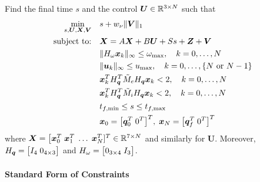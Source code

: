 \documentclass[12pt]{article}
\begin{document}
\begin{problem}
Find the final time $s$ and the control $\bm{U}\in{\mathbb{R}}^{3 \times N}$ such that
\begin{subequations}
\begin{align}
\min_{s,\bm{U},\bm{X},\bm{V}} &\quad s + w_{\nu} \| \bm{V} \|_1 \\
\text{subject to:} &\quad \bm{X} = A \bm{X} + B \bm{U} + S s + \bm{Z} + \bm{V} \\
&\quad \| H_{\omega} \bm{x}_k \|_{\infty} \leq \omega_{\max}, \quad k=0,\ldots,N \\ 
&\quad \| \bm{u}_k \|_{\infty} \leq u_{\max}, \quad k=0,\ldots,\{N \text{ or } N-1\} \\
&\quad \bm{x}_k^T H_{\bm{q}}^T \tilde{M}_e H_{\bm{q}} \bm{x}_k < 2, \quad k=0,\ldots,N \\
&\quad \bm{x}_k^T H_{\bm{q}}^T \tilde{M}_i H_{\bm{q}} \bm{x}_k < 2, \quad k=0,\ldots,N \\
&\quad t_{f,\min} \leq s \leq t_{f,\max} \\
&\quad \bm{x}_0 = \big[ \bm{q}_0^T \; 0^T \big]^T, \; \bm{x}_N = \big[ \bm{q}_f^T \; 0^T \big]^T
\end{align}
\end{subequations}
where $\bm{X} = \big[ \bm{x}_0^T \; \bm{x}_1^T \; \ldots \; \bm{x}_{N}^T ]^T \in {\mathbb{R}}^{7 \times N}$ and similarly for $\bm{U}$. Moreover, $H_{\bm{q}} = \big[ I_{4} \; 0_{4 \times 3} \big]$ and $H_{\omega} = \big[ 0_{3 \times 4} \; I_{3} \big]$.
\end{problem}

\paragraph{Standard Form of Constraints}
\end{document}
